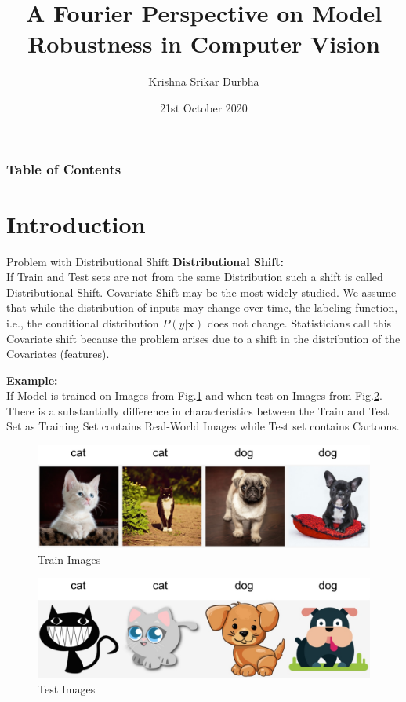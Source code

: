 \documentclass[8pt]{beamer}
\title[Report]{A Fourier Perspective on Model Robustness in Computer Vision}
\author{Krishna Srikar Durbha}
\date{21st October 2020}
\begin{document}
\begin{frame}
  \titlepage
\end{frame}

\begin{frame}
\frametitle{Table of Contents}
\tableofcontents
\end{frame}

\section{Introduction}
\begin{frame}[allowframebreaks]{Problem with Distributional Shift}
\textbf{Distributional Shift:}\\
\qquad If Train and Test sets are not from the same Distribution such a shift is called Distributional Shift. Covariate Shift may be the most widely studied. We assume that while the distribution of inputs may change over time, the labeling function, i.e., the conditional distribution $P(y|\textbf{x})$  does not change. Statisticians call this Covariate shift because the problem arises due to a shift in the distribution of the Covariates (features).

\vspace{0.25in}

\textbf{Example:}\\
\qquad If Model is trained on Images from Fig.\ref{fig:Train Images} and when test on Images from Fig.\ref{fig:Test Images}. There is a substantially difference in characteristics between the Train and Test Set as Training Set contains Real-World Images while Test set contains Cartoons.

\framebreak

\begin{figure}
    \centering
    \includegraphics[scale=0.2]{../Images/cat-dog-train.jpg}
    \caption{Train Images}
    \label{fig:Train Images}
\end{figure}

\begin{figure}
    \centering
    \includegraphics[scale=0.2]{../Images/cat-dog-test.jpg}
    \caption{Test Images}
    \label{fig:Test Images}
\end{figure}
\end{frame}
\end{document}
